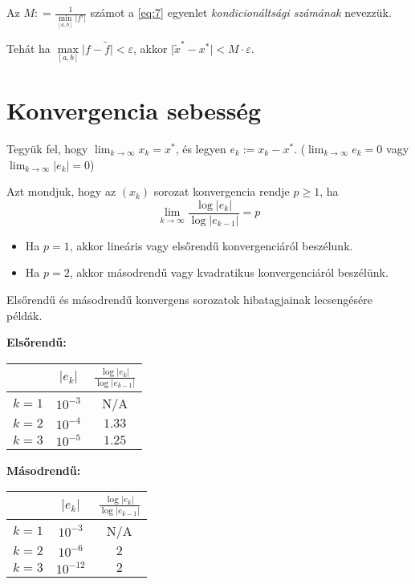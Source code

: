\begin{definition}
    Az $M : = \frac{1}{\min \limits_{[a, b]} \lvert f' \rvert  }$ számot a \ref{eq:7} egyenlet \textit{kondicionáltsági számának} nevezzük.
\end{definition}

Tehát ha $\max \limits_{[a, b]}\lvert f - \tilde{f} \rvert < \varepsilon$, akkor $\lvert  \tilde{x}^{*} - x^{*} \rvert < M \cdot \varepsilon$.


\section{Konvergencia sebesség}
Tegyük fel, hogy $\lim_{ k \to \infty }x_{k} = x^{*}$, és legyen $e_{k} := x_{k} - x^{*}$. ($\lim_{ k \to \infty } e_{k} = 0$ vagy $\lim_{ k \to \infty }\lvert e_{k} \rvert = 0$)

\begin{definition}
    Azt mondjuk, hogy az $(x_{k})$ sorozat konvergencia rendje $p \geq 1$, ha
    \begin{equation*}
        \lim_{ k \to \infty } \frac{\log \lvert e_{k} \rvert }{\log \lvert e_{k-1} \rvert } = p
    \end{equation*}
    \begin{itemize}
        \item Ha $p = 1$, akkor lineáris vagy elsőrendű konvergenciáról beszélunk.
        \item Ha $p = 2$, akkor másodrendű vagy kvadratikus konvergenciáról beszélünk.
    \end{itemize}
\end{definition}

\begin{pelda} Elsőrendű és másodrendű konvergens sorozatok hibatagjainak lecsengésére példák.
    
\textbf{Elsőrendű:}
\begin{center}
\begin{tabular}{||c c c||} 
 \hline
  & $\lvert e_k \rvert$ & $\frac{\log \lvert e_{k} \rvert}{\log \lvert e_{k-1} \rvert}$ \\ [0.5ex] 
 \hline\hline
 $k = 1$ & $10^{-3}$ & N/A \\ 
 \hline
 $k = 2$ & $10^{-4}$ & $1.33$ \\
 \hline
 $k = 3$ & $10^{-5}$ & $1.25$ \\ [1ex] 
 \hline
\end{tabular}
\end{center}

\textbf{Másodrendű:}
\begin{center}
\begin{tabular}{||c c c||} 
 \hline
  & $\lvert e_k \rvert$ & $\frac{\log \lvert e_{k} \rvert}{\log \lvert e_{k-1} \rvert}$ \\ [0.5ex] 
 \hline\hline
 $k = 1$ & $10^{-3}$ & N/A \\ 
 \hline
 $k = 2$ & $10^{-6}$ & $2$ \\
 \hline
 $k = 3$ & $10^{-12}$ & $2$ \\ [1ex] 
 \hline
\end{tabular}
\end{center}
\end{pelda}


